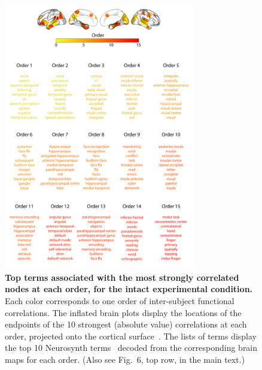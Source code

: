 \documentclass[english]{article}
\newcommand{\neurosynth}{6}
\begin{document}
\begin{figure}[p!]
\centering
\includegraphics[width=0.75\textwidth]{figs/supp_15_intact}
\caption{\textbf{Top terms associated with the most strongly
      correlated nodes at each order, for the intact experimental
    condition.}  Each color corresponds to one order of inter-subject
functional correlations. The inflated brain plots display the
locations of the endpoints of the 10 strongest (absolute value)
correlations at each order, projected onto the cortical
surface~\citep{CombEtal19}.  The lists of terms display
the top 10 Neurosynth terms~\citep{RubiEtal17} decoded from the
corresponding brain maps for each order.  (Also see Fig.~\neurosynth,
top row, in the main text.)}
\label{fig:intact}
\end{figure}
\end{document}
